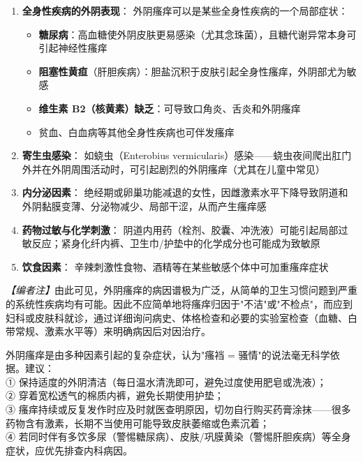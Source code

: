 \begin{enumerate}
\begin{enumerate}
	\item \textbf{全身性疾病的外阴表现}：
	外阴瘙痒可以是某些全身性疾病的一个局部症状：
	\begin{itemize}
		\item \textbf{糖尿病}：高血糖使外阴皮肤更易感染（尤其念珠菌），且糖代谢异常本身可引起神经性瘙痒
		\item \textbf{阻塞性黄疸}（肝胆疾病）：胆盐沉积于皮肤引起全身性瘙痒，外阴部尤为敏感
		\item \textbf{维生素 B2（核黄素）缺乏}：可导致口角炎、舌炎和外阴瘙痒
		\item 贫血、白血病等其他全身性疾病也可伴发瘙痒
	\end{itemize}

	\item \textbf{寄生虫感染}：
	如蛲虫（Enterobius vermicularis）感染——蛲虫夜间爬出肛门外并在外阴周围活动时，可引起剧烈的外阴瘙痒（尤其在儿童中常见）

	\item \textbf{内分泌因素}：
	绝经期或卵巢功能减退的女性，因雌激素水平下降导致阴道和外阴黏膜变薄、分泌物减少、局部干涩，从而产生瘙痒感

	\item \textbf{药物过敏与化学刺激}：
	阴道内用药（栓剂、胶囊、冲洗液）可能引起局部过敏反应；紧身化纤内裤、卫生巾/护垫中的化学成分也可能成为致敏原

	\item \textbf{饮食因素}：
	辛辣刺激性食物、酒精等在某些敏感个体中可加重瘙痒症状
\end{enumerate}

\noindent\textit{【编者注】}由此可见，外阴瘙痒的病因谱极为广泛，从简单的卫生习惯问题到严重的系统性疾病均有可能。因此不应简单地将瘙痒归因于"不洁"或"不检点"，而应到妇科或皮肤科就诊，通过详细询问病史、体格检查和必要的实验室检查（血糖、白带常规、激素水平等）来明确病因后对因治疗。

\begin{tcolorbox}[colback=pink!5!white,colframe=red!50!black,title=贴心小叮咛]
外阴瘙痒是由多种因素引起的复杂症状，认为"瘙裆 = 骚情"的说法毫无科学依据。建议：\\
① 保持适度的外阴清洁（每日温水清洗即可，避免过度使用肥皂或洗液）；\\
② 穿着宽松透气的棉质内裤，避免长期使用护垫；\\
③ 瘙痒持续或反复发作时应及时就医查明原因，切勿自行购买药膏涂抹——很多药物含有激素，长期不当使用可能导致皮肤萎缩或色素沉着；\\
④ 若同时伴有多饮多尿（警惕糖尿病）、皮肤/巩膜黄染（警惕肝胆疾病）等全身症状，应优先排查内科病因。
\end{tcolorbox}


\end{enumerate}

